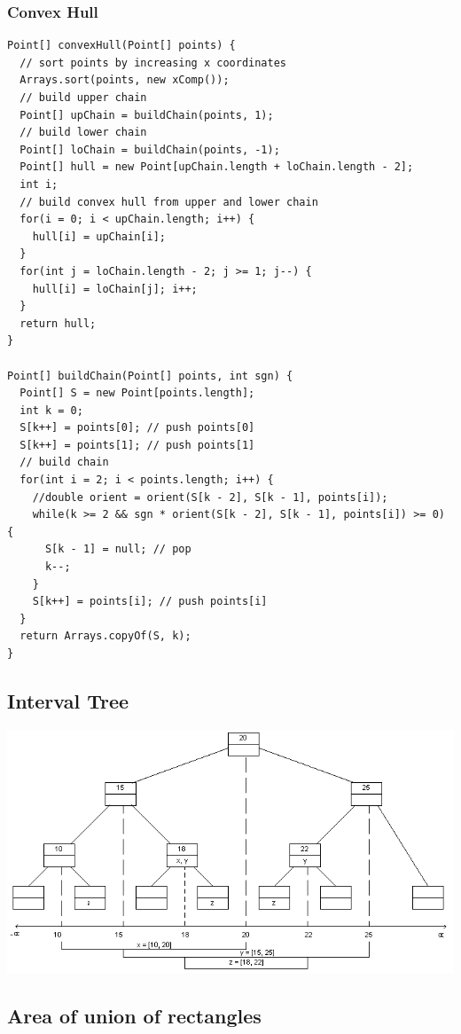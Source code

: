 \subsubsection{Convex Hull}
\begin{lstlisting}
Point[] convexHull(Point[] points) {
  // sort points by increasing x coordinates
  Arrays.sort(points, new xComp());
  // build upper chain
  Point[] upChain = buildChain(points, 1);
  // build lower chain
  Point[] loChain = buildChain(points, -1);
  Point[] hull = new Point[upChain.length + loChain.length - 2];
  int i;
  // build convex hull from upper and lower chain
  for(i = 0; i < upChain.length; i++) {
    hull[i] = upChain[i];
  }
  for(int j = loChain.length - 2; j >= 1; j--) {
    hull[i] = loChain[j]; i++;
  }
  return hull;
}

Point[] buildChain(Point[] points, int sgn) {
  Point[] S = new Point[points.length];
  int k = 0;
  S[k++] = points[0]; // push points[0]
  S[k++] = points[1]; // push points[1]
  // build chain
  for(int i = 2; i < points.length; i++) {
    //double orient = orient(S[k - 2], S[k - 1], points[i]);
    while(k >= 2 && sgn * orient(S[k - 2], S[k - 1], points[i]) >= 0) {
      S[k - 1] = null; // pop
      k--;
    }
    S[k++] = points[i]; // push points[i]
  }
  return Arrays.copyOf(S, k);
}
\end{lstlisting}

\subsection{Interval Tree}

\includegraphics[scale=0.38]{Geometrie/it.png}



\subsection{Area of union of rectangles}

